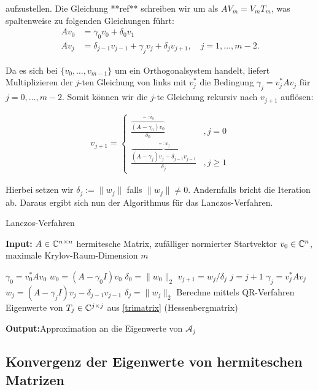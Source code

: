 \documentclass{article}
\begin{document}
aufzustellen. Die Gleichung **ref** schreiben wir um als $AV_m = V_m T_m$, was spaltenweise zu folgenden Gleichungen führt:
\begin{align*}
	A v_0 &= \gamma_0 v_0 + \delta_0 v_1 \\
	A v_j &= \delta_{j-1} v_{j-1} + \gamma_j v_j + \delta_j v_{j+1}, \quad j=1, \dots, m-2.
\end{align*}

Da es sich bei $\{v_0, \dots, v_{m-1}\}$ um ein Orthogonalsystem handelt, liefert Multiplizieren der $j$-ten Gleichung von links mit $v_j^*$ die Bedingung $\gamma_j = v_j^*Av_j$ für $j = 0, \dots, m-2$. Somit können wir die $j$-te Gleichung rekursiv nach $v_{j+1}$ auflösen:

\begin{align*}
	v_{j+1} = \begin{cases}
		\frac{\overbrace{(A-\gamma_0)v_0}^{=:w_0}}{\delta_0} &,j = 0 \\
		\frac{\overbrace{(A-\gamma_j)v_j - \delta_{j-1} v_{j-1}}^{=:w_j}}{\delta_j} &,j \geq 1
	\end{cases}
\end{align*}

Hierbei setzen wir $\delta_j := \|w_j\|$ falls $\|w_j\| \neq 0$. Andernfalls bricht die Iteration ab. Daraus ergibt sich nun der Algorithmus für das Lanczos-Verfahren.

\renewcommand{\algorithmicrequire}{\textbf{Input:}}
\renewcommand{\algorithmicensure}{\textbf{Output:}}

\begin{algorithm}
	\label{Lanczos-Verfahren}
	\caption{Lanczos-Verfahren}
	\algorithmicrequire{ $A \in \mathbb{C}^{n\times n}$ hermitesche Matrix, zufälliger normierter Startvektor $v_0 \in \mathbb{C}^n$, maximale Krylov-Raum-Dimension $m$}
	\begin{algorithmic}[1]
		\State $\gamma_0 = v_0^*Av_0$
		\State $w_0 = (A-\gamma_0 I)v_0$
	  \State $\delta_0 = \|w_0\|_2$
		\State $v_{j+1} = w_j/\delta_j$
		\State $j = j+1$
		\State $\gamma_j = v_j^*Av_j$
		\State $w_j = (A-\gamma_j I)v_j - \delta_{j-1}v_{j-1}$
		\State $\delta_j = \|w_j\|_2$
		\EndWhile
		\State Berechne mittels QR-Verfahren Eigenwerte von $T_j \in \mathbb{C}^{j \times j}$ aus \ref{trimatrix} (Hessenbergmatrix)
	\end{algorithmic}
	\algorithmicensure{Approximation an die Eigenwerte von $\mathcal{A}_j$}
\end{algorithm}


\subsection{Konvergenz der Eigenwerte von hermiteschen Matrizen}
\end{document}
